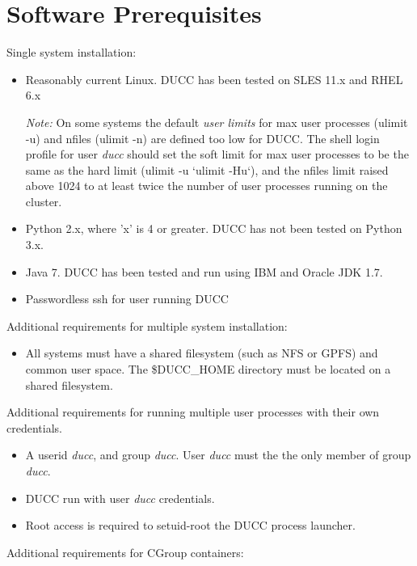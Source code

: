 \section{Software Prerequisites}
\label{sec:install.prerequisites}

Single system installation:

\begin{itemize}
  \item Reasonably current Linux.  DUCC has been tested on SLES 11.x and RHEL 6.x
    
    {\em Note:} On some systems the default {\em user limits}
    for max user processes (ulimit -u) and nfiles (ulimit -n) are defined too
    low for DUCC. The shell login profile for user {\em ducc} should set the
    soft limit for max user processes to be the same as the hard limit
    (ulimit -u `ulimit -Hu`), and
    the nfiles limit raised above 1024 to at least twice the number of user
    processes running on the cluster.

  \item Python 2.x, where 'x' is 4 or greater.  DUCC has not been tested on Python 3.x.
  \item Java 7. DUCC has been tested and run using IBM and Oracle JDK 1.7.
  \item Passwordless ssh for user running DUCC
\end{itemize}
  
Additional requirements for multiple system installation:

\begin{itemize}
  \item All systems must have a shared filesystem (such as NFS or GPFS) and common user space.
        The \$DUCC\_HOME directory must be located on a shared filesystem.
\end{itemize}
  
Additional requirements for running multiple user processes with their own credentials.

\begin{itemize}
  \item A userid {\em ducc}, and group {\em ducc}.  User {\em ducc} must the the only member of group {\em ducc}.
  \item DUCC run with user {\em ducc} credentials.
  \item Root access is required to setuid-root the DUCC process launcher.
\end{itemize}
  
Additional requirements for CGroup containers:

